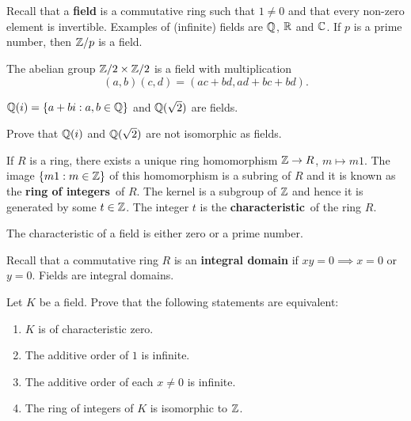 \chapter{}


Recall that a \textbf{field} is a commutative
ring such that $1\ne 0$ and 
that every non-zero element is invertible. Examples
of (infinite) fields are $\mathbb{Q}$, $\mathbb{R}$ and $\mathbb{C}$. If $p$
is a prime number, then $\mathbb{Z}/p$ is a field. 

\begin{example}
	The abelian group $\mathbb{Z}/2\times\mathbb{Z}/2$ is a field
	with multiplication
	\[
		(a,b)(c,d)=(ac+bd,ad+bc+bd).
	\]
\end{example}

\begin{example}
	$\mathbb{Q}(i)=\{a+bi:a,b\in\mathbb{Q}\}$ and 
	$\mathbb{Q}(\sqrt{2})$ are fields.
\end{example}

\begin{exercise}
	\label{xca:Q(i)}
	Prove that $\mathbb{Q}(i)$ and $\mathbb{Q}(\sqrt{2})$ are not isomorphic as fields.
\end{exercise}

If $R$ is a ring, there exists a unique ring homomorphism
$\mathbb{Z}\to R$, $m\mapsto m1$. The image $\{m1:m\in\mathbb{Z}\}$ 
of this homomorphism is a subring 
of $R$ and it is known as the \textbf{ring of integers} of $R$. The
kernel is a subgroup of $\mathbb{Z}$ and hence  it is generated by
some $t\in\mathbb{Z}$. The integer $t$ is 
the \textbf{characteristic} of the ring $R$. 

\begin{exercise}
	The characteristic of a field is either zero or
	a prime number. 
\end{exercise}

Recall that a commutative ring $R$ is an \textbf{integral 
domain} if $xy=0\implies x=0$ or $y=0$. Fields
are integral domains. 

\begin{exercise}
	Let $K$ be a field. Prove that
	the following statements are equivalent:
	\begin{enumerate}
		\item $K$ is of characteristic zero.
		\item The additive order of $1$ is infinite. 
		\item The additive order of each $x\ne0$ is infinite.
		\item The ring of integers of $K$ is isomorphic to $\mathbb{Z}$.
	\end{enumerate}
\end{exercise}


